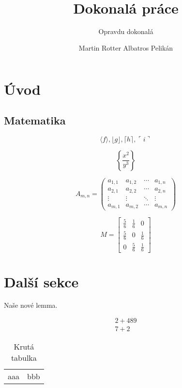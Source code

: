 \documentclass[12pt]{article}
\title{Dokonalá práce}						%
\subtitle{Opravdu dokonalá}
\author{Martin Rotter Albatros Pelikán}
\begin{document}
\maketitle

\section{Úvod}

\subsection{Matematika}
$$\langle f \rangle, \lfloor g \rfloor,
\lceil h \rceil, \ulcorner i \urcorner$$

$$\left\{\frac{x^2}{y^3}\right\}$$

$$
A_{m,n} =
 \begin{pmatrix}
  a_{1,1} & a_{1,2} & \cdots & a_{1,n} \\
  a_{2,1} & a_{2,2} & \cdots & a_{2,n} \\
  \vdots  & \vdots  & \ddots & \vdots  \\
  a_{m,1} & a_{m,2} & \cdots & a_{m,n}
 \end{pmatrix}
$$

$$
M = \begin{bmatrix}
       \frac{5}{6} & \frac{1}{6} & 0           \\[0.3em]
       \frac{5}{6} & 0           & \frac{1}{6} \\[0.3em]
       0           & \frac{5}{6} & \frac{1}{6}
     \end{bmatrix}
$$

\section{Další sekce}

\begin{lemma}
Naše nové lemma.
\end{lemma}

\begin{align}
2+489 \\
7+2
\end{align}


\begin{table}
\begin{tabular}{c | c}
aaa & bbb 
\end{tabular}
\caption{Krutá tabulka}
\end{table}
\end{document}
